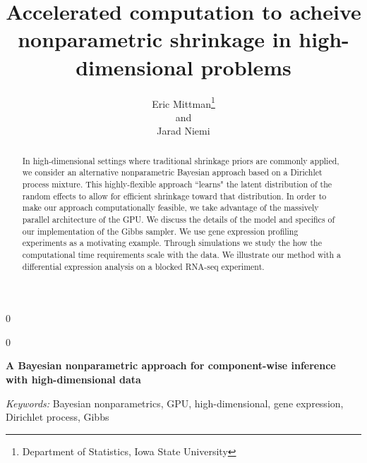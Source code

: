 \documentclass[12pt]{article}
\newcommand{\blind}{0}
\begin{document}
\newtoggle{thesis}
\togglefalse{thesis}

%

\def\spacingset#1{\renewcommand{\baselinestretch}%
{#1}\small\normalsize} \spacingset{1}
  
  
    
    \blind
  {
    \title{\bf Accelerated computation to acheive nonparametric shrinkage in high-dimensional problems}
    \author{Eric Mittman\thanks{Department of Statistics, Iowa State University}\\
    and\\
    Jarad Niemi\footnotemark[1]}
      
      
    \maketitle
  } \fi
  
  \blind
  {
    \bigskip
    \bigskip
    \bigskip
    \begin{center}
    {\LARGE\bf A Bayesian nonparametric approach for component-wise inference with high-dimensional data}
    \end{center}
    \medskip
  } \fi
  
  \bigskip
  \begin{abstract}
  In high-dimensional settings where traditional shrinkage priors are commonly applied, we consider an alternative nonparametric Bayesian approach based on a Dirichlet process mixture. This highly-flexible approach ``learns" the latent distribution of the random effects to allow for efficient shrinkage toward that distribution. In order to make our approach computationally feasible, we take advantage of the massively parallel architecture of the GPU. We discuss the details of the model and specifics of our implementation of the Gibbs sampler. We use gene expression profiling experiments as a motivating example. Through simulations we study the how the computational time requirements scale with the data. We illustrate our method with a differential expression analysis on a blocked RNA-seq experiment.
  \end{abstract}
  
  \noindent%
  {\it Keywords:}  Bayesian nonparametrics, GPU, high-dimensional, gene expression, Dirichlet process, Gibbs
  
  \spacingset{1.45}
  
  
\end{document}
